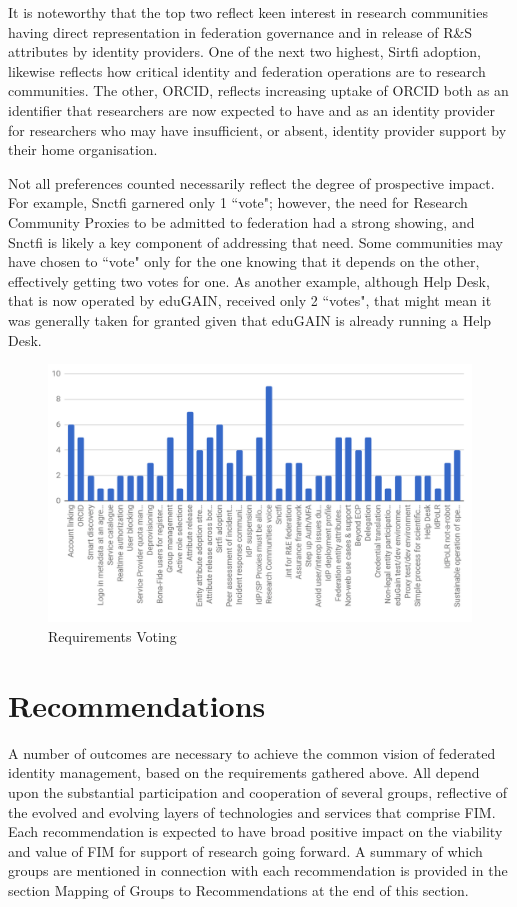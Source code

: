 \documentclass[fleqn,10pt]{wlscirep}
\begin{document}
{It is noteworthy that the top two reflect keen interest in research communities having direct representation in federation governance and in release of R\&S attributes by identity providers. One of the next two highest, Sirtfi adoption, likewise reflects how critical identity and federation operations are to research communities. The other, ORCID, reflects increasing uptake of ORCID both as an identifier that researchers are now expected to have and as an identity provider for researchers who may have insufficient, or absent, identity provider support by their home organisation.

Not all preferences counted necessarily reflect the degree of prospective impact. For example, Snctfi garnered only 1 ``vote"; however, the need for Research Community Proxies to be admitted to federation had a strong showing, and Snctfi is likely a key component of addressing that need. Some communities may have chosen to ``vote" only for the one knowing that it depends on the other, effectively getting two votes for one. As another example, although Help Desk, that is now operated by eduGAIN, received only 2 ``votes", that might mean it was generally taken for granted given that eduGAIN is already running a Help Desk. 

\begin{figure}[ht!]
  \centering
  \includegraphics[width=0.7\columnwidth]{RequirementsVoting.png}
  \caption{Requirements Voting}
  \label{fig:voting}
\end{figure}

\section{Recommendations}
A number of outcomes are necessary to achieve the common vision of federated identity management, based on the requirements gathered above. All depend upon the substantial participation and cooperation of several groups, reflective of the evolved and evolving layers of technologies and services that comprise FIM. Each recommendation is expected to have broad positive impact on the viability and value of FIM for support of research going forward. A summary of which groups are mentioned in connection with each recommendation is provided in the section Mapping of Groups to Recommendations at the end of this section.
}
\end{document}

